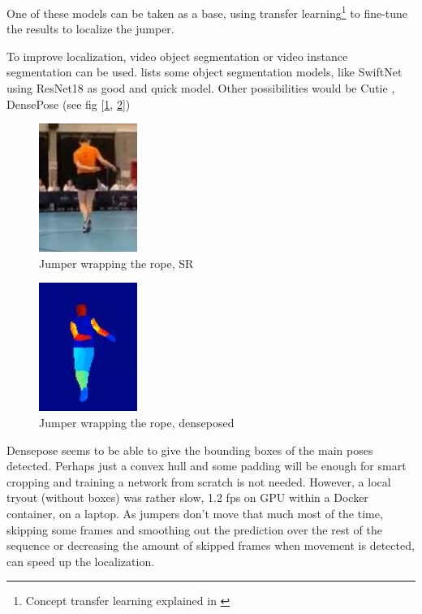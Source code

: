 One of these models can be taken as a base, using transfer learning\footnote{Concept transfer learning explained in \autocite{Bharadiya_2023}} to fine-tune the results to localize the jumper.

To improve localization, video object segmentation or video instance segmentation can be used. \textcite{Gao_2022} lists some object segmentation models, like SwiftNet \textcite{Wang_2021} using ResNet18 as good and quick model.
Other possibilities would be Cutie \autocite{Cheng_2023}, DensePose (see fig [\ref{fig:srwrap}, \ref{fig:srwrapdense}]) \autocite{Guler_2018}

\begin{figure}
    \centering
    \includegraphics[width=0.3\linewidth]{img/sr_wrap}
    \caption{Jumper wrapping the rope, SR}
    \label{fig:srwrap}
\end{figure}

\begin{figure}
    \centering
    \includegraphics[width=0.3\linewidth]{img/sr_wrap_dense}
    \caption{Jumper wrapping the rope, denseposed}
    \label{fig:srwrapdense}
\end{figure}

Densepose seems to be able to give the bounding boxes of the main poses detected. Perhaps just a convex hull and some padding will be enough for smart cropping and training a network from scratch is not needed.
However, a local tryout (without boxes) was rather slow, 1.2 fps on GPU within a Docker container, on a laptop.
As jumpers don’t move that much most of the time, skipping some frames and smoothing out the prediction over the rest of the sequence or decreasing the amount of skipped frames when movement is detected, can speed up the localization.

